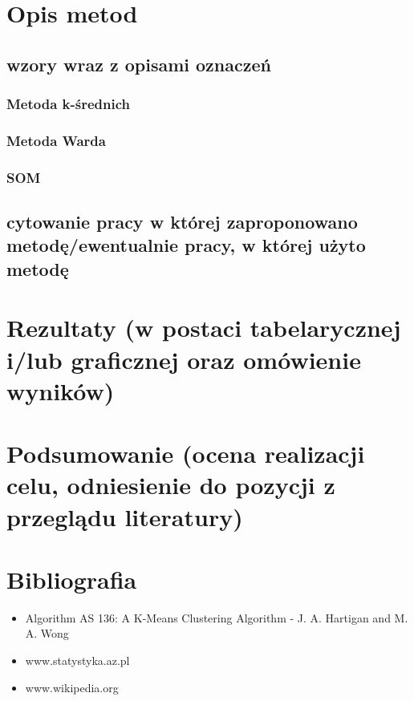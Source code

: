 \documentclass{article}
\begin{document}
\section{Opis metod}
    \subsection{wzory wraz z opisami oznaczeń}
        \subsubsection*{Metoda k-średnich}
        \subsubsection*{Metoda Warda}
        \subsubsection*{SOM}
    \subsection{cytowanie pracy w której zaproponowano metodę/ewentualnie pracy, w której użyto metodę}

\section{Rezultaty (w postaci tabelarycznej i/lub graficznej oraz omówienie wyników)}
\section{Podsumowanie (ocena realizacji celu, odniesienie do pozycji z przeglądu literatury)}
\section{Bibliografia}
    \begin{itemize}
        \item Algorithm AS 136: A K-Means Clustering Algorithm - J. A. Hartigan and M. A. Wong
        \item www.statystyka.az.pl
        \item www.wikipedia.org
    \end{itemize}
\end{document}
